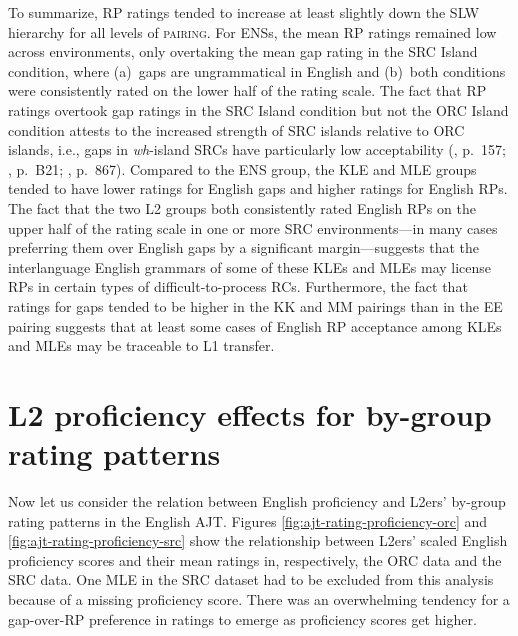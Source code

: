To summarize, RP ratings tended to increase at least slightly down the SLW hierarchy for all levels of \textsc{pairing}. For ENSs, the mean RP ratings remained low across environments, only overtaking the mean gap rating in the SRC Island condition, where (a)~gaps are ungrammatical in English and (b)~both conditions were consistently rated on the lower half of the rating scale. The fact that RP ratings overtook gap ratings in the SRC Island condition but not the ORC Island condition attests to the increased strength of SRC islands relative to ORC islands, i.e., gaps in \textit{wh}-island SRCs have particularly low acceptability (\cite{han.etal2012}, p.~157; \cite{mcdaniel.cowart1999}, p.~B21; \cite{morgan.wagers2018}, p.~867).\footnotemark{} Compared to the ENS group, the KLE and MLE groups tended to have lower ratings for English gaps and higher ratings for English RPs. The fact that the two L2 groups both consistently rated English RPs on the upper half of the rating scale in one or more SRC environments---in many cases preferring them over English gaps by a significant margin---suggests that the interlanguage English grammars of some of these KLEs and MLEs may license RPs in certain types of difficult-to-process RCs. Furthermore, the fact that ratings for gaps tended to be higher in the KK and MM pairings than in the EE pairing suggests that at least some cases of English RP acceptance among KLEs and MLEs may be traceable to L1 transfer.


\section{L2 proficiency effects for by-group rating patterns}\label{ajt-rating-proficiency}

Now let us consider the relation between English proficiency and L2ers' by-group rating patterns in the English AJT. Figures \ref{fig:ajt-rating-proficiency-orc} and \ref{fig:ajt-rating-proficiency-src} show the relationship between L2ers' scaled English proficiency scores and their mean ratings in, respectively, the ORC data and the SRC data. One MLE in the SRC dataset had to be excluded from this analysis because of a missing proficiency score. There was an overwhelming tendency for a gap-over-RP preference in ratings to emerge as proficiency scores get higher. 

